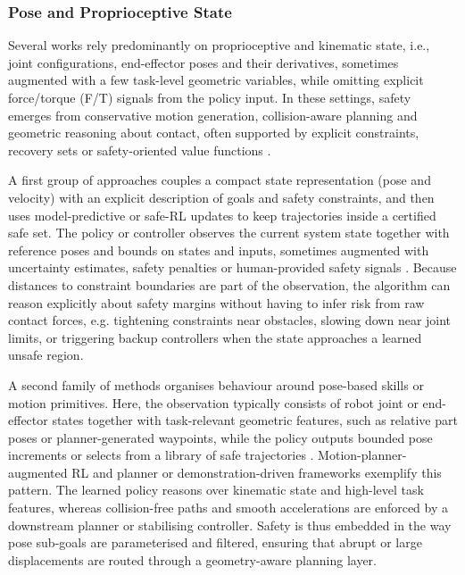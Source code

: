 \documentclass[Afour,sageh,times]{template/sagej}
\begin{document}
\subsubsection{Pose and Proprioceptive State}

Several works rely predominantly on proprioceptive and kinematic state, i.e., joint configurations, end-effector poses and their derivatives, sometimes augmented with a few task-level geometric variables, while omitting explicit force/torque (F/T) signals from the policy input. In these settings, safety emerges from conservative motion generation, collision-aware planning and geometric reasoning about contact, often supported by explicit constraints, recovery sets or safety-oriented value functions \citep{21,22,27,34,42,45,48,91,96,99,103}.

A first group of approaches couples a compact state representation (pose and velocity) with an explicit description of goals and safety constraints, and then uses model-predictive or safe-RL updates to keep trajectories inside a certified safe set. The policy or controller observes the current system state together with reference poses and bounds on states and inputs, sometimes augmented with uncertainty estimates, safety penalties or human-provided safety signals \citep{21,22,42,45,54,57,103}. Because distances to constraint boundaries are part of the observation, the algorithm can reason explicitly about safety margins without having to infer risk from raw contact forces, e.g. tightening constraints near obstacles, slowing down near joint limits, or triggering backup controllers when the state approaches a learned unsafe region.

A second family of methods organises behaviour around pose-based skills or motion primitives. Here, the observation typically consists of robot joint or end-effector states together with task-relevant geometric features, such as relative part poses or planner-generated waypoints, while the policy outputs bounded pose increments or selects from a library of safe trajectories \citep{27,34,96,99}. Motion-planner-augmented RL and planner or demonstration-driven frameworks exemplify this pattern. The learned policy reasons over kinematic state and high-level task features, whereas collision-free paths and smooth accelerations are enforced by a downstream planner or stabilising controller. Safety is thus embedded in the way pose sub-goals are parameterised and filtered, ensuring that abrupt or large displacements are routed through a geometry-aware planning layer.
\end{document}
